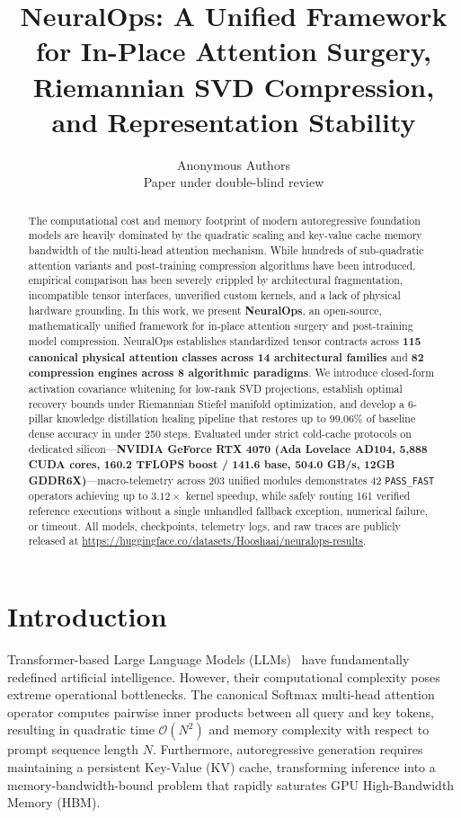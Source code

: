 \documentclass{article}
\title{NeuralOps: A Unified Framework for In-Place Attention Surgery, Riemannian SVD Compression, and Representation Stability}
\author{
  Anonymous Authors \\
  Paper under double-blind review
}
\newcommand{\passfast}{\texttt{PASS\_FAST}}
\begin{document}
\maketitle

\begin{abstract}
The computational cost and memory footprint of modern autoregressive foundation models are heavily dominated by the quadratic scaling and key-value cache memory bandwidth of the multi-head attention mechanism. While hundreds of sub-quadratic attention variants and post-training compression algorithms have been introduced, empirical comparison has been severely crippled by architectural fragmentation, incompatible tensor interfaces, unverified custom kernels, and a lack of physical hardware grounding. In this work, we present \textbf{NeuralOps}, an open-source, mathematically unified framework for in-place attention surgery and post-training model compression. NeuralOps establishes standardized tensor contracts across \textbf{115 canonical physical attention classes across 14 architectural families} and \textbf{82 compression engines across 8 algorithmic paradigms}. We introduce closed-form activation covariance whitening for low-rank SVD projections, establish optimal recovery bounds under Riemannian Stiefel manifold optimization, and develop a 6-pillar knowledge distillation healing pipeline that restores up to $99.06\%$ of baseline dense accuracy in under 250 steps. Evaluated under strict cold-cache protocols on dedicated silicon---\textbf{NVIDIA GeForce RTX 4070 (Ada Lovelace AD104, 5,888 CUDA cores, 160.2 TFLOPS boost / 141.6 base, 504.0 GB/s, 12GB GDDR6X)}---macro-telemetry across 203 unified modules demonstrates 42 \passfast{} operators achieving up to $3.12\times$ kernel speedup, while safely routing 161 verified reference executions without a single unhandled fallback exception, numerical failure, or timeout. All models, checkpoints, telemetry logs, and raw traces are publicly released at \url{https://huggingface.co/datasets/Hooshaai/neuralops-results}.
\end{abstract}

\section{Introduction}
\label{sec:introduction}
Transformer-based Large Language Models (LLMs)~\citep{vaswani2017attention} have fundamentally redefined artificial intelligence. However, their computational complexity poses extreme operational bottlenecks. The canonical Softmax multi-head attention operator computes pairwise inner products between all query and key tokens, resulting in quadratic time $\mathcal{O}(N^2)$ and memory complexity with respect to prompt sequence length $N$. Furthermore, autoregressive generation requires maintaining a persistent Key-Value (KV) cache, transforming inference into a memory-bandwidth-bound problem that rapidly saturates GPU High-Bandwidth Memory (HBM).
\end{document}
